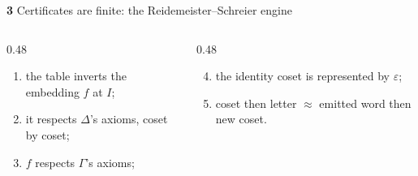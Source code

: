 \begin{frame}{\textbf{3}\; Certificates are finite: the Reidemeister--Schreier engine}
\begin{columns}[T]
\begin{column}{0.48\textwidth}
\scriptsize
\begin{enumerate}
  \item the table inverts the embedding $f$ at $I$;
  \item it respects $\Delta$'s axioms, coset by coset;
  \item $f$ respects $\Gamma$'s axioms;
\end{enumerate}
\end{column}
\begin{column}{0.48\textwidth}
\scriptsize
\begin{enumerate}
  \setcounter{enumi}{3}
  \item the identity coset is represented by $\varepsilon$;
  \item coset then letter $\approx$ emitted word then new coset.
\end{enumerate}
\end{column}
\end{columns}
\end{frame}

